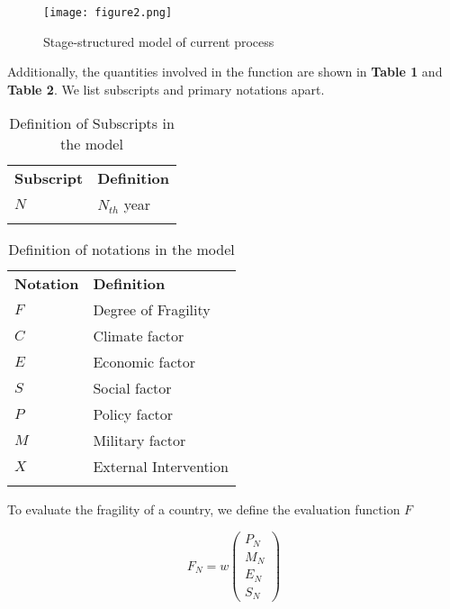 \documentclass{mcmthesis}
\newlength\savedwidth
\newcommand\whline{\noalign{\global\savedwidth\arrayrulewidth
		\global\arrayrulewidth 1.2pt}%
	\hline
	\noalign{\global\arrayrulewidth\savedwidth}}
\newlength\savewidth
\newcommand\shline{\noalign{\global\savewidth\arrayrulewidth
		\global\arrayrulewidth 1.2pt}%
	\hline
	\noalign{\global\arrayrulewidth\savewidth}}
\begin{document}
	\begin{figure}[h]
		\small
		\centering
		\texttt{[image: figure2.png]}
		\caption{Stage-structured model of current process} \label{fig:Stage-structured model of current process}
	\end{figure}
	
	\noindent Additionally, the quantities involved in the function are shown in \textbf{Table 1} and \textbf{Table 2}. We list subscripts and primary notations apart.\\
	
	\begin{table}[htbp]
		\renewcommand\arraystretch{1.5}
		\footnotesize
		\centering
		\begin{tabular}{m{3cm}<{\centering}|m{10cm}<{\centering}}
			\whline
			\textbf{Subscript}&\textbf{Definition}\\
			\whline 
			$N$&$N_{th}$ year\\ 
			\shline
		\end{tabular}
		\caption{Definition of Subscripts in the model}\label{tab:Definition of Subscripts in the model}
	\end{table}
	\begin{table}[htbp]
		\renewcommand\arraystretch{1.5}
		\footnotesize
		\centering
		\begin{tabular}{m{3cm}<{\centering}|m{10cm}<{\centering}}
			\whline
			\textbf{Notation}&\textbf{Definition}\\
			\whline 
			$F$&Degree of Fragility\\
			$C$&Climate factor\\
			$E$&Economic factor\\
			$S$&Social factor\\
			$P$&Policy factor\\ 
			$M$&Military factor\\
			$X$&External Intervention\\
			\shline
		\end{tabular}
		\caption{Definition of notations in the model}\label{tab:Definition of notations in the model}
	\end{table}
	
	To evaluate the fragility of a country, we define the evaluation function $F$
	
	\begin{equation}
	F_N = w 
	\left(
	\begin{matrix}
	P_N \\ M_N \\ E_N \\ S_N
	\end{matrix}
	\right)
	\end{equation}
	
\end{document}
